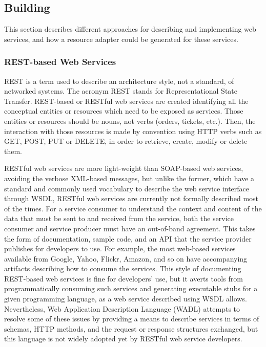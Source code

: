 \documentclass{fast_latex}
\begin{document}
\subsection{Building} %
\label{sub:building}

This section describes different approaches for describing and implementing web services, and how a resource adapter could be generated for these services.

\subsubsection{REST-based Web Services} %
\label{ssub:rest_based_web_services}

REST \cite{Fielding2000} is a term used to describe an architecture style, not a standard, of networked systems. The acronym REST stands for Representational State Transfer. REST-based or RESTful web services are created identifying all the conceptual entities or resources which need to be exposed as services. Those entities or resources should be nouns, not verbs (orders, tickets, etc.). Then, the interaction with those resources is made by convention using HTTP verbs such as GET, POST, PUT or DELETE, in order to retrieve, create, modify or delete them.

RESTful web services are more light-weight than SOAP-based web services, avoiding the verbose XML-based messages, but unlike the former, which have a standard and commonly used vocabulary to describe the web service interface through WSDL, RESTful web services are currently not formally described most of the times. For a service consumer to understand the context and content of the data that must be sent to and received from the service, both the service consumer and service producer must have an out-of-band agreement. This takes the form of documentation, sample code, and an API that the service provider publishes for developers to use. For example, the most web-based services available from Google, Yahoo, Flickr, Amazon, and so on have accompanying artifacts describing how to consume the services. This style of documenting REST-based web services is fine for developers' use, but it averts tools from programmatically consuming such services and generating executable stubs for a given programming language, as a web service described using WSDL allows. Nevertheless, Web Application Description Language (WADL) attempts to resolve some of these issues by providing a means to describe services in terms of schemas, HTTP methods, and the request or response structures exchanged, but this language is not widely adopted yet by RESTful web service developers.
\end{document}
